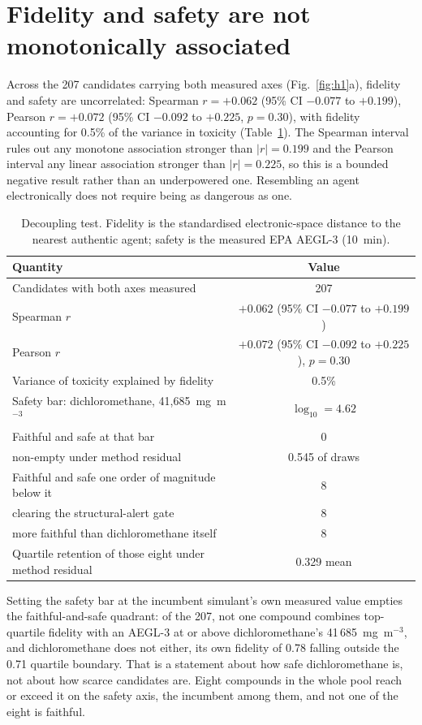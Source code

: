 \documentclass[11pt,a4paper]{article}
\begin{document}
\section{Fidelity and safety are not monotonically associated}
\label{res:h1}

Across the 207 candidates carrying both measured axes (Fig.~\ref{fig:h1}a),
fidelity and safety are uncorrelated: Spearman $r=+0.062$ (95\% CI $-0.077$ to
$+0.199$), Pearson $r=+0.072$ (95\% CI $-0.092$ to $+0.225$, $p=0.30$), with
fidelity accounting for 0.5\% of the variance in toxicity
(Table~\ref{tab:h1}). The Spearman interval rules out any monotone association
stronger than $|r|=0.199$ and the Pearson interval any linear association
stronger than $|r|=0.225$, so this is a bounded negative result rather than an
underpowered one. Resembling an agent electronically does not require being as
dangerous as one.

\begin{table}[!htb]
\centering
\caption{Decoupling test. Fidelity is the standardised electronic-space distance to
the nearest authentic agent; safety is the measured EPA AEGL-3 (10~min).}
\label{tab:h1}
\small
\begin{tabular}{lc}
\hline
Quantity & Value \\
\hline
Candidates with both axes measured & 207 \\
Spearman $r$ & $+0.062$ (95\% CI $-0.077$ to $+0.199$) \\
Pearson $r$ & $+0.072$ (95\% CI $-0.092$ to $+0.225$), $p = 0.30$ \\
Variance of toxicity explained by fidelity & 0.5\% \\
\hline
Safety bar: dichloromethane, 41,685~mg~m$^{-3}$ & $\log_{10} = 4.62$ \\
Faithful and safe at that bar & 0 \\
\quad non-empty under method residual & 0.545 of draws \\
Faithful and safe one order of magnitude below it & 8 \\
\quad clearing the structural-alert gate & 8 \\
\quad more faithful than dichloromethane itself & 8 \\
Quartile retention of those eight under method residual & 0.329 mean \\
\hline
\end{tabular}
\end{table}

Setting the safety bar at the incumbent simulant's own measured value empties the
faithful-and-safe quadrant: of the 207, not one compound combines
top-quartile fidelity with an AEGL-3 at or above dichloromethane's
41\,685~mg~m$^{-3}$, and dichloromethane does not either, its own fidelity of
0.78 falling outside the 0.71 quartile boundary. That is a statement
about how safe dichloromethane is, not about how scarce candidates are. Eight
compounds in the whole pool reach or exceed it on the safety axis, the incumbent
among them, and not one of the eight is faithful.
\end{document}
